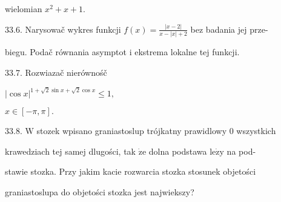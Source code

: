 \documentclass[a4paper,12pt]{article}
\begin{document}
wielomian $x^{2}+x+1.$

33.6. Narysowač wykres funkcji $f(x) = \displaystyle \frac{|x-2|}{x-|x|+2}$ bez badania jej prze-

biegu. Podač równania asymptot $\mathrm{i}$ ekstrema lokalne tej funkcji.

33.7. Rozwiazač nierównośč

$|\cos x|^{1+\sqrt{2}\sin x+\sqrt{2}\cos x}\leq 1,$

$x\in[-\pi,\pi].$

33.8. $\mathrm{W}$ stozek wpisano graniastoslup trójkatny prawidlowy $0$ wszystkich

krawedziach tej samej dlugości, tak $\dot{\mathrm{z}}\mathrm{e}$ dolna podstawa $\mathrm{l}\mathrm{e}\dot{\mathrm{z}}\mathrm{y}$ na pod-

stawie stozka. Przy jakim kacie rozwarcia stozka stosunek objetości

graniastoslupa do objetości stozka jest najwiekszy?
\end{document}
